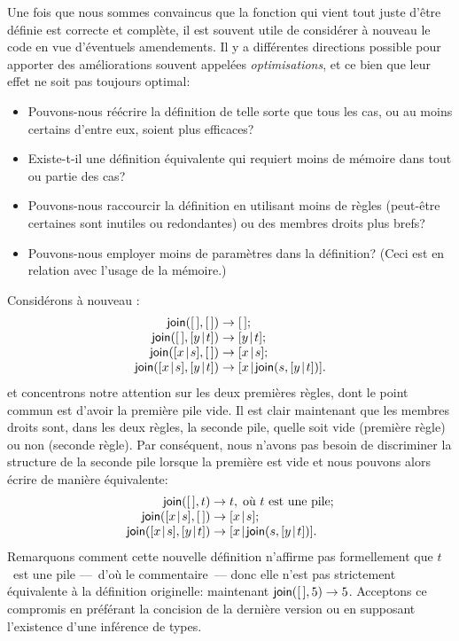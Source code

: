 Une fois que nous sommes convaincus que la fonction qui vient tout
juste d'être définie est correcte et complète, il est souvent utile de
considérer à nouveau le code en vue d'éventuels amendements. Il y a
différentes directions possible pour apporter des améliorations
souvent appelées \emph{optimisations}, et ce bien que leur effet ne
soit pas toujours optimal:
\begin{itemize}

\item Pouvons-nous réécrire la définition de telle sorte que tous les
  cas, ou au moins certains d'entre eux, soient plus efficaces?

\item Existe-t-il une définition équivalente qui requiert moins de
  mémoire dans tout ou partie des cas?

\item Pouvons-nous raccourcir la définition en utilisant moins de
  règles (peut-être certaines sont inutiles ou redondantes) ou des
  membres droits plus brefs?

\item Pouvons-nous employer moins de paramètres dans la définition?
  (Ceci est en relation avec l'usage de la mémoire.)

\end{itemize}
Considérons à nouveau :
\begin{equation*}
\begin{array}{r@{\;}l@{\;}l}
\fun{join}(\el,\el) & \rightarrow & \el;\\
\fun{join}(\el,\cons{y}{t}) & \rightarrow & \cons{y}{t};\\
\fun{join}(\cons{x}{s},\el) & \rightarrow & \cons{x}{s};\\
\fun{join}(\cons{x}{s},\cons{y}{t}) & \rightarrow & \cons{x}{\fun{join}(s,\cons{y}{t})}.
\end{array}
\end{equation*}
et concentrons notre attention sur les deux premières règles, dont le
point commun est d'avoir la première pile vide. Il est clair
maintenant que les membres droits sont, dans les deux règles, la
seconde pile, quelle soit vide (première règle) ou non (seconde
règle). Par conséquent, nous n'avons pas besoin de discriminer la
structure de la seconde pile lorsque la première est vide et nous
pouvons alors écrire de manière équivalente:
\begin{equation*}
\begin{array}{r@{\;}l@{\;}l}
\fun{join}(\el,t) & \rightarrow & t,\;\text{où \(t\) est une pile};\\
\fun{join}(\cons{x}{s},\el) & \rightarrow & \cons{x}{s};\\
\fun{join}(\cons{x}{s},\cons{y}{t}) & \rightarrow &
  \cons{x}{\fun{join}(s,\cons{y}{t})}.
\end{array}
\end{equation*}
Remarquons comment cette nouvelle définition n'affirme pas
formellement que \(t\)~est une pile ---~d'où le commentaire~--- donc
elle n'est pas strictement équivalente à la définition originelle:
maintenant \(\textsf{join}([\,],5) \rightarrow 5\). Acceptons ce compromis
en préférant la concision de la dernière version ou en supposant
l'existence d'une inférence de types.


